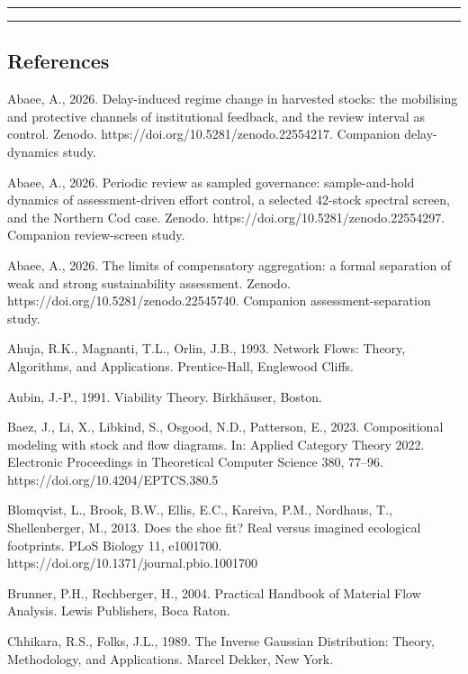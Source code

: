 \documentclass[11pt]{article}
\begin{document}
\begin{center}\rule{0.5\linewidth}{0.5pt}\end{center}

\begin{center}\rule{0.5\linewidth}{0.5pt}\end{center}

\subsection{References}\label{references}

Abaee, A., 2026. Delay-induced regime change in harvested stocks: the
mobilising and protective channels of institutional feedback, and the
review interval as control. Zenodo.
https://doi.org/10.5281/zenodo.22554217. Companion delay-dynamics study.

Abaee, A., 2026. Periodic review as sampled governance: sample-and-hold
dynamics of assessment-driven effort control, a selected 42-stock
spectral screen, and the Northern Cod case. Zenodo.
https://doi.org/10.5281/zenodo.22554297. Companion review-screen study.

Abaee, A., 2026. The limits of compensatory aggregation: a formal
separation of weak and strong sustainability assessment. Zenodo.
https://doi.org/10.5281/zenodo.22545740. Companion assessment-separation
study.

Ahuja, R.K., Magnanti, T.L., Orlin, J.B., 1993. Network Flows: Theory, Algorithms, and Applications. Prentice-Hall, Englewood Cliffs.

Aubin, J.-P., 1991. Viability Theory. Birkh\"auser, Boston.

Baez, J., Li, X., Libkind, S., Osgood, N.D., Patterson, E., 2023. Compositional modeling with stock and flow diagrams. In: Applied Category Theory 2022. Electronic Proceedings in Theoretical Computer Science 380, 77--96. https://doi.org/10.4204/EPTCS.380.5

Blomqvist, L., Brook, B.W., Ellis, E.C., Kareiva, P.M., Nordhaus, T.,
Shellenberger, M., 2013. Does the shoe fit? Real versus imagined
ecological footprints. PLoS Biology 11, e1001700.
https://doi.org/10.1371/journal.pbio.1001700

Brunner, P.H., Rechberger, H., 2004. Practical Handbook of Material Flow
Analysis. Lewis Publishers, Boca Raton.

Chhikara, R.S., Folks, J.L., 1989. The Inverse Gaussian Distribution:
Theory, Methodology, and Applications. Marcel Dekker, New York.
\end{document}
